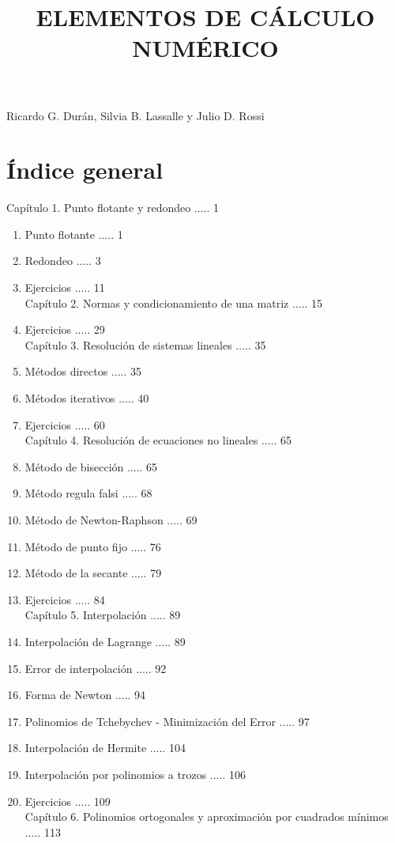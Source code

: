 \documentclass[10pt]{article}
\title{ELEMENTOS DE CÁLCULO NUMÉRICO }
\author{}
\date{}
\begin{document}
\maketitle
\captionsetup{singlelinecheck=false}
Ricardo G. Durán, Silvia B. Lassalle y Julio D. Rossi

\section*{Índice general}
Capítulo 1. Punto flotante y redondeo ..... 1

\begin{enumerate}
  \item Punto flotante ..... 1
  \item Redondeo ..... 3
  \item Ejercicios ..... 11\\
Capítulo 2. Normas y condicionamiento de una matriz ..... 15
  \item Ejercicios ..... 29\\
Capítulo 3. Resolución de sistemas lineales ..... 35
  \item Métodos directos ..... 35
  \item Métodos iterativos ..... 40
  \item Ejercicios ..... 60\\
Capítulo 4. Resolución de ecuaciones no lineales ..... 65
  \item Método de bisección ..... 65
  \item Método regula falsi ..... 68
  \item Método de Newton-Raphson ..... 69
  \item Método de punto fijo ..... 76
  \item Método de la secante ..... 79
  \item Ejercicios ..... 84\\
Capítulo 5. Interpolación ..... 89
  \item Interpolación de Lagrange ..... 89
  \item Error de interpolación ..... 92
  \item Forma de Newton ..... 94
  \item Polinomios de Tchebychev - Minimización del Error ..... 97
  \item Interpolación de Hermite ..... 104
  \item Interpolación por polinomios a trozos ..... 106
  \item Ejercicios ..... 109\\
Capítulo 6. Polinomios ortogonales y aproximación por cuadrados mínimos ..... 113

\end{enumerate}
\end{document}
